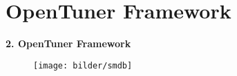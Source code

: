 %     
    
  \section{OpenTuner Framework}
  
  



  
  \begin{frame}
  
  \textbf{2. OpenTuner Framework}
    
  
  \begin{figure}[ht]
    \centering	      
    \texttt{[image: bilder/smdb]}
    \label{smdb}
  \end{figure}
  
  \end{frame}
    
